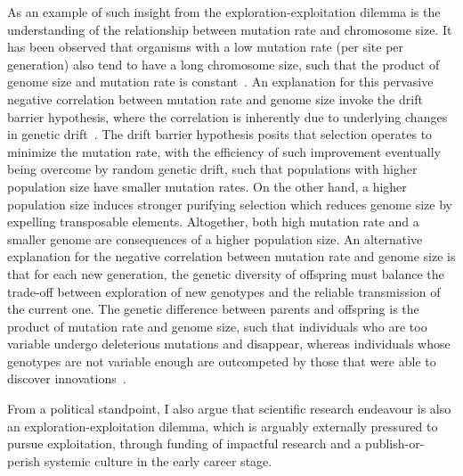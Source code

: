 As an example of such insight from the exploration-exploitation dilemma is the understanding of the relationship between mutation rate and chromosome size.
It has been observed that organisms with a low mutation rate (per site per generation) also tend to have a long chromosome size, such that the product of genome size and mutation rate is constant~\citep{Drake1991}.
An explanation for this pervasive negative correlation between mutation rate and genome size invoke the drift barrier hypothesis, where the correlation is inherently due to underlying changes in genetic drift~\citep{Lynch2016a}.
The drift barrier hypothesis posits that selection operates to minimize the mutation rate, with the efficiency of such improvement eventually being overcome by random \gls{genetic drift}, such that populations with higher population size have smaller mutation rates.
On the other hand, a higher population size induces stronger purifying selection which reduces genome size by expelling transposable elements.
Altogether, both high mutation rate and a smaller genome are consequences of a higher population size.
An alternative explanation for the negative correlation between mutation rate and genome size is that for each new generation, the genetic diversity of offspring must balance the trade-off between exploration of new genotypes and the reliable transmission of the current one.
The genetic difference between parents and offspring is the product of mutation rate and genome size, such that individuals who are too variable undergo deleterious mutations and disappear, whereas individuals whose genotypes are not variable enough are outcompeted by those that were able to discover innovations~\citep{Knibbe2007, Beslon2010, Hindre2012, Batut2014, Biller2016}.

From a political standpoint, I also argue that scientific research endeavour is also an exploration-exploitation dilemma, which is arguably externally pressured to pursue exploitation, through funding of impactful research and a publish-or-perish systemic culture in the early career stage.
